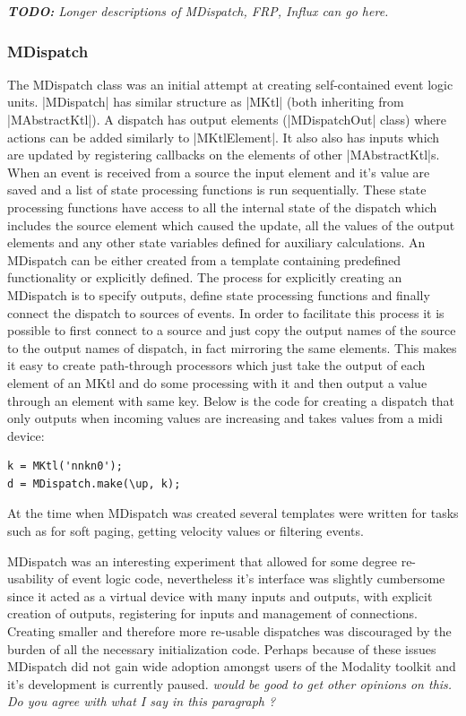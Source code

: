 \documentclass{article}
\newcommand{\todo}[1] {\emph{\textbf{TODO:} #1}}
\begin{document}
\todo {Longer descriptions of MDispatch, FRP, Influx can go here.}


	
\subsubsection{MDispatch}	

The MDispatch class was an initial attempt at creating self-contained event logic units. |MDispatch| has similar structure as |MKtl| (both inheriting from |MAbstractKtl|). A dispatch has output elements (|MDispatchOut| class) where actions can be added similarly to |MKtlElement|. It also also has inputs which are updated by registering callbacks on the elements of other |MAbstractKtl|s. When an event is received from a source the input element and it's value are saved and a list of state processing functions is run sequentially. These state processing functions have access to all the internal state of the dispatch which includes the source element which caused the update, all the values of the output elements and any other state variables defined for auxiliary calculations. An MDispatch can be either created from a template containing predefined functionality or explicitly defined. The process for explicitly creating an MDispatch is to specify outputs, define state processing functions and finally connect the dispatch to sources of events. In order to facilitate this process it is possible to first connect to a source and just copy the output names of the source to the output names of dispatch, in fact mirroring the same elements. This makes it easy to create path-through processors which just take the output of each element of an MKtl and do some processing with it and then output a value through an element with same key. Below is the code for creating a dispatch that only outputs when incoming values are increasing and takes values from a midi device:

\begin{Verbatim}
k = MKtl('nnkn0');
d = MDispatch.make(\up, k);
\end{Verbatim}

At the time when MDispatch was created several templates were written for tasks such as for soft paging, getting velocity values or filtering events. 

MDispatch was an interesting experiment that allowed for some degree re-usability of event logic code, nevertheless it's interface was slightly cumbersome since it acted as a virtual device with many inputs and outputs, with explicit creation of outputs, registering for inputs and management of connections. Creating smaller and therefore more re-usable dispatches was discouraged by the burden of all the necessary initialization code. Perhaps because of these issues MDispatch did not gain wide adoption amongst users of the Modality toolkit and it's development is currently paused. \emph{ would be good to get other opinions on this. Do you agree with what I say in this paragraph ? }
		
\end{document}
